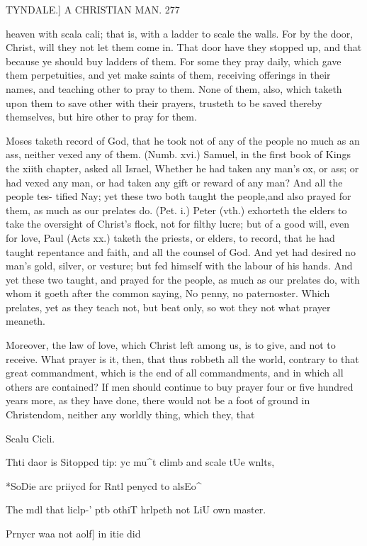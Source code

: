 \documentclass{custom}
\begin{document}
{TYNDALE.]
A CHRISTIAN MAN.
277

heaven with scala cali; that is, with a ladder to scale the 
walls. For by the door, Christ, will they not let them 
come in. That door have they stopped up, and that 
because ye should buy ladders of them. For some they 
pray daily, which gave them perpetuities, and yet make 
saints of them, receiving offerings in their names, and 
teaching other to pray to them. None of them, also, 
which taketh upon them to save other with their prayers, 
trusteth to be saved thereby themselves, but hire other to 
pray for them. 

Moses taketh record of God, that he took not of any 
of the people no much as an ass, neither vexed any of 
them. (Numb. xvi.) Samuel, in the first book of Kings 
the xiith chapter, asked all Israel, Whether he had taken 
any man's ox, or ass; or had vexed any man, or had taken 
any gift or reward of any man? And all the people tes- 
tified Nay; yet these two both taught the people,and also 
prayed for them, as much as our prelates do. (Pet. i.) 
Peter (vth.) exhorteth the elders to take the oversight of 
Christ's flock, not for filthy lucre; but of a good will, 
even for love, Paul (Acts xx.) taketh the priests, or 
elders, to record, that he had taught repentance and faith, 
and all the counsel of God. And yet had desired no 
man's gold, silver, or vesture; but fed himself with the 
labour of his hands. And yet these two taught, and 
prayed for the people, as much as our prelates do, with 
whom it goeth after the common saying, No penny, no 
paternoster. Which prelates, yet as they teach not, but 
beat only, so wot they not what prayer meaneth. 

Moreover, the law of love, which Christ left among us, 
is to give, and not to receive. What prayer is it, then, 
that thus robbeth all the world, contrary to that great 
commandment, which is the end of all commandments, 
and in which all others are contained? If men should 
continue to buy prayer four or five hundred years more, 
as they have done, there would not be a foot of ground in 
Christendom, neither any worldly thing, which they, that 

Scalu Cicli. 

Thti daor 
is Sitoppcd 
tip: yc 
mu^t climb 
and scale 
tUe wnlts, 

*SoDie arc 
priiycd for 
Rntl penycd 
to alsEo^ 

The mdl 
that liclp-' 
ptb othiT 
hrlpeth not 
LiU own 
master. 

Prnycr waa 
not aolf] in 
itie did 

}
\end{document}

